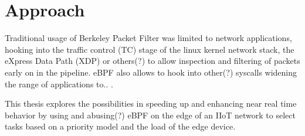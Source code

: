 \section{Approach}


Traditional usage of Berkeley Packet Filter was limited to network applications,
hooking into the traffic control (TC) stage of the linux kernel network stack,
the eXpress Data Path (XDP) or others(?) to allow inspection and filtering of
packets early on in the pipeline. eBPF also allows to hook into other(?)
syscalls widening the range of applications to.. .

This thesis explores the possibilities in speeding up and enhancing near real
time behavior by using and abusing(?) eBPF on the edge of an IIoT network to select
tasks based on a priority model and the load of the edge device.
